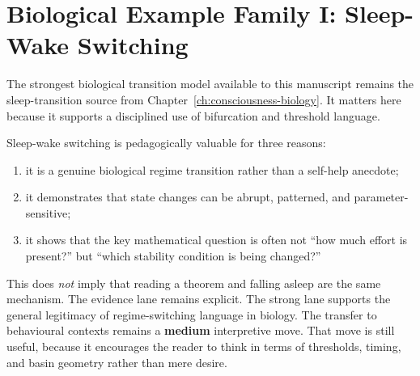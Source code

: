 \section{Biological Example Family I: Sleep-Wake Switching}

The strongest biological transition model available to this manuscript remains
the sleep-transition source from Chapter~\ref{ch:consciousness-biology}. It
matters here because it supports a disciplined use of bifurcation and threshold
language.

\begin{discussion}
Sleep-wake switching is pedagogically valuable for three reasons:
\begin{enumerate}[nosep]
  \item it is a genuine biological regime transition rather than a self-help
        anecdote;
  \item it demonstrates that state changes can be abrupt, patterned, and
        parameter-sensitive;
  \item it shows that the key mathematical question is often not ``how much
        effort is present?'' but ``which stability condition is being changed?''
\end{enumerate}
\end{discussion}

This does \emph{not} imply that reading a theorem and falling asleep are the
same mechanism. The evidence lane remains explicit. The strong lane supports
the general legitimacy of regime-switching language in biology. The transfer to
behavioural contexts remains a \textbf{medium} interpretive move. That move is
still useful, because it encourages the reader to think in terms of thresholds,
timing, and basin geometry rather than mere desire.
